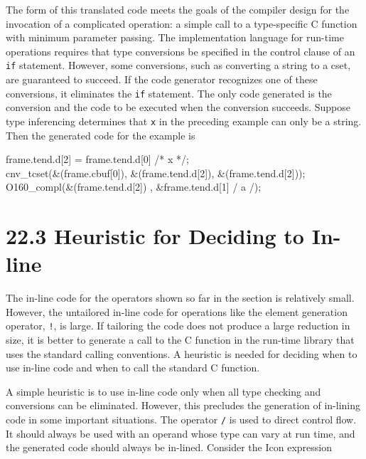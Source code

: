 
\noindent
The form of this translated code meets the goals of the compiler
design for the invocation of a complicated operation: a simple call to
a type-specific C function with minimum parameter passing. The
implementation language for run-time operations requires that type
conversions be specified in the control clause of an \texttt{if}
statement. However, some conversions, such as converting a string to a
cset, are guaranteed to succeed. If the code generator recognizes one
of these conversions, it eliminates the \texttt{if} statement. The
only code generated is the conversion and the code to be executed when
the conversion succeeds. Suppose type inferencing determines that
\texttt{x} in the preceding example can only be a string. Then the
generated code for the example is

\goodbreak
\begin{iconcode}
\>frame.tend.d[2] = frame.tend.d[0] /* x */;\\
\>cnv\_tcset(\&(frame.cbuf[0]), \&(frame.tend.d[2]), \&(frame.tend.d[2]));\\
\>O160\_compl(\&(frame.tend.d[2]) , \&frame.tend.d[1] / a /);\\
\end{iconcode}


\section[22.3 Heuristic for Deciding to In-line]{22.3 Heuristic for Deciding to In-line}

The in-line code for the operators shown so far in the section is
relatively small. However, the untailored in-line code for operations
like the element generation operator, \texttt{!}, is large. If tailoring the
code does not produce a large reduction in size, it is better to
generate a call to the C function in the run-time library that uses
the standard calling conventions. A heuristic is needed for deciding
when to use in-line code and when to call the standard C function.


A simple heuristic is to use in-line code only when all type checking
and conversions can be eliminated. However, this precludes the
generation of in-lining code in some important situations. The
operator \texttt{/} is used to direct control flow.  It should always be used
with an operand whose type can vary at run time, and the generated
code should always be in-lined. Consider the Icon expression

